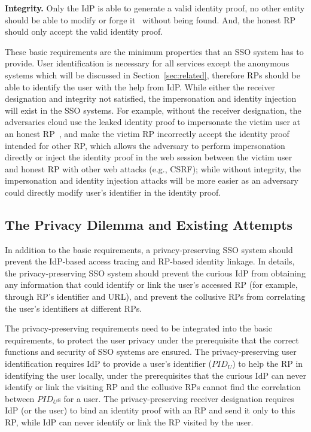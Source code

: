 \vspace{1mm}\noindent\textbf{Integrity.} Only the IdP is able to generate a valid identity proof,
     no other entity should be able to modify or forge it~\cite{WangZLG16} without being found. And, the honest RP should only accept the valid identity proof.


These basic requirements are the minimum properties that an SSO system has to provide.
User identification is necessary for all services except the anonymous systems which will be discussed in Section~\ref{sec:related},
 therefore RPs should be able to identify the user with the help from IdP.
While either the receiver designation and integrity not satisfied, the impersonation and identity injection will exist in the SSO systems.
For example, without the receiver designation,  the adversaries cloud use the leaked identity proof to impersonate the victim user at an honest RP~\cite{ChenPCTKT14,FettKS16,WangZLG16}, and  make the victim RP  incorrectly accept the identity proof intended for other RP, which allows the adversary to perform impersonation directly or inject the identity proof in the web session between the victim user and honest RP with other web attacks (e.g., CSRF);
while without integrity, the impersonation and identity injection attacks will be more easier as an adversary could directly modify user's identifier in the identity proof.



\subsection{The Privacy Dilemma and Existing Attempts}
\label{subsec:challenges}
In addition to the basic requirements, a privacy-preserving SSO system should prevent the IdP-based access tracing %
and RP-based identity linkage.
In details, the privacy-preserving SSO system should prevent the curious IdP from obtaining any information that could identify or link the user's accessed RP (for example, through RP's identifier and URL),
and prevent  the collusive RPs from correlating the user's identifiers at different RPs.

The privacy-preserving requirements need to be integrated into the basic requirements, to protect the user privacy under the prerequisite that the correct functions and security of SSO systems are ensured.
The privacy-preserving user identification requires IdP to provide a user's identifier ($PID_U$) to help the RP in identifying the user locally,
 under the prerequisites that the curious IdP can never identify or link the visiting RP and the collusive RPs cannot find the correlation between $PID_U$s for a user.
The privacy-preserving receiver designation requires IdP (or the user) to bind an identity proof with an RP and send it only to this RP,
 while IdP can never identify or link the RP visited by the user.

